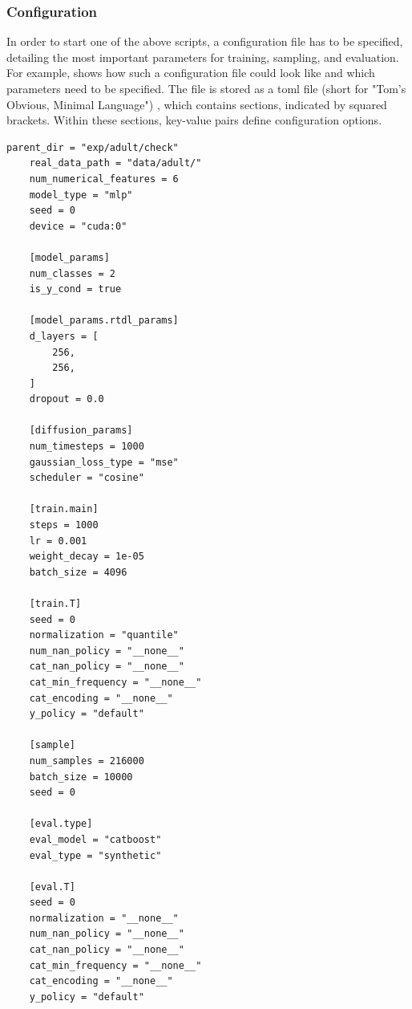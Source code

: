 \subsubsection[]{Configuration}

In order to start one of the above scripts, a configuration file has to be specified, detailing the most important parameters for training, sampling, and evaluation.
For example,  shows how such a configuration file could look like and which parameters need to be specified.
The file is stored as a \gls{toml}  file (short for "Tom's Obvious, Minimal Language") \cite{preston-werner2021TOMLTomObviousa}, which contains sections, indicated by squared brackets. 
Within these sections, key-value pairs define configuration options.

\begin{lstlisting}[label={lst:configuration}, caption={Example Configuration File}]
    parent_dir = "exp/adult/check"
    real_data_path = "data/adult/"
    num_numerical_features = 6
    model_type = "mlp"
    seed = 0
    device = "cuda:0"

    [model_params]
    num_classes = 2
    is_y_cond = true

    [model_params.rtdl_params]
    d_layers = [
        256,
        256,
    ]
    dropout = 0.0

    [diffusion_params]
    num_timesteps = 1000
    gaussian_loss_type = "mse"
    scheduler = "cosine"

    [train.main]
    steps = 1000
    lr = 0.001
    weight_decay = 1e-05
    batch_size = 4096

    [train.T]
    seed = 0
    normalization = "quantile"
    num_nan_policy = "__none__"
    cat_nan_policy = "__none__"
    cat_min_frequency = "__none__"
    cat_encoding = "__none__"
    y_policy = "default"

    [sample]
    num_samples = 216000
    batch_size = 10000
    seed = 0

    [eval.type]
    eval_model = "catboost"
    eval_type = "synthetic"

    [eval.T]
    seed = 0
    normalization = "__none__"
    num_nan_policy = "__none__"
    cat_nan_policy = "__none__"
    cat_min_frequency = "__none__"
    cat_encoding = "__none__"
    y_policy = "default"
\end{lstlisting}



